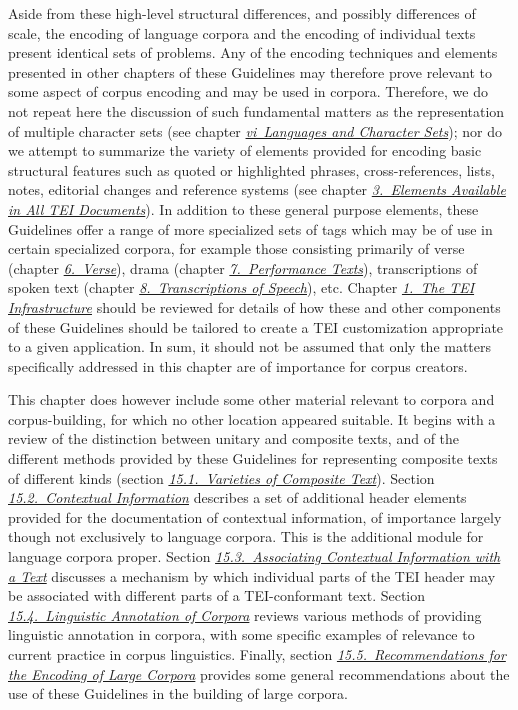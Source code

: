 Aside from these high-level structural differences, and possibly differences of scale, the encoding of language corpora and the encoding of individual texts present identical sets of problems. Any of the encoding techniques and elements presented in other chapters of these Guidelines may therefore prove relevant to some aspect of corpus encoding and may be used in corpora. Therefore, we do not repeat here the discussion of such fundamental matters as the representation of multiple character sets (see chapter \textit{\hyperref[CH]{vi\ Languages and Character Sets}}); nor do we attempt to summarize the variety of elements provided for encoding basic structural features such as quoted or highlighted phrases, cross-references, lists, notes, editorial changes and reference systems (see chapter \textit{\hyperref[CO]{3.\ Elements Available in All TEI Documents}}). In addition to these general purpose elements, these Guidelines offer a range of more specialized sets of tags which may be of use in certain specialized corpora, for example those consisting primarily of verse (chapter \textit{\hyperref[VE]{6.\ Verse}}), drama (chapter \textit{\hyperref[DR]{7.\ Performance Texts}}), transcriptions of spoken text (chapter \textit{\hyperref[TS]{8.\ Transcriptions of Speech}}), etc. Chapter \textit{\hyperref[ST]{1.\ The TEI Infrastructure}} should be reviewed for details of how these and other components of these Guidelines should be tailored to create a TEI customization appropriate to a given application. In sum, it should not be assumed that only the matters specifically addressed in this chapter are of importance for corpus creators.\par
This chapter does however include some other material relevant to corpora and corpus-building, for which no other location appeared suitable. It begins with a review of the distinction between unitary and composite texts, and of the different methods provided by these Guidelines for representing composite texts of different kinds (section \textit{\hyperref[CCDEF]{15.1.\ Varieties of Composite Text}}). Section \textit{\hyperref[CCAH]{15.2.\ Contextual Information}} describes a set of additional header elements provided for the documentation of contextual information, of importance largely though not exclusively to language corpora. This is the additional module for language corpora proper. Section \textit{\hyperref[CCAS]{15.3.\ Associating Contextual Information with a Text}} discusses a mechanism by which individual parts of the TEI header may be associated with different parts of a TEI-conformant text. Section \textit{\hyperref[CCAN]{15.4.\ Linguistic Annotation of Corpora}} reviews various methods of providing linguistic annotation in corpora, with some specific examples of relevance to current practice in corpus linguistics. Finally, section \textit{\hyperref[CCREC]{15.5.\ Recommendations for the Encoding of Large Corpora}} provides some general recommendations about the use of these Guidelines in the building of large corpora.
